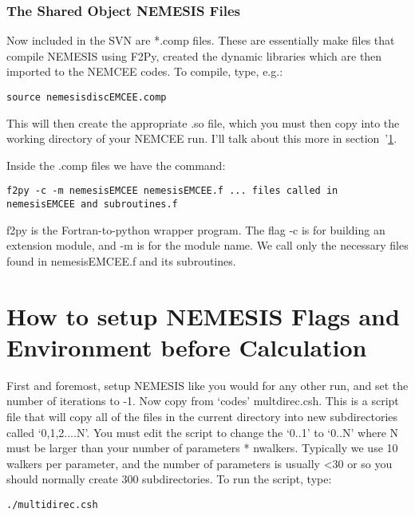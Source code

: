 \documentclass[11pt, a4paper,titlepage]{report}
\begin{document}
\subsubsection{The Shared Object NEMESIS Files}

Now included in the SVN are *.comp files. These are essentially make files that compile NEMESIS using F2Py, created the dynamic libraries which are then imported to the NEMCEE codes. To compile, type, e.g.:

\lstset{language=csh} 
\begin{lstlisting}
source nemesisdiscEMCEE.comp

\end{lstlisting}

This will then create the appropriate .so file, which you must then copy into the working directory of your NEMCEE run. I'll talk about this more in section~'\ref{sec:setup}. 

Inside the .comp files we have the command:

\lstset{language=csh} 
\begin{lstlisting}
f2py -c -m nemesisEMCEE nemesisEMCEE.f ... files called in 
nemesisEMCEE and subroutines.f
\end{lstlisting}

f2py is the Fortran-to-python wrapper program. The flag -c is for building an extension module, and -m is for the module name. We call only the necessary files found in nemesisEMCEE.f and its subroutines.

\section{How to setup NEMESIS Flags and Environment before Calculation}\label{sec:setup}

First and foremost, setup NEMESIS like you would for any other run, and set the number of iterations to -1. Now copy from `codes' multdirec.csh. This is a script file that will copy all of the files in the current directory into new subdirectories called `0,1,2....N'. You must edit the script to change the `0..1' to `0..N' where N must be larger than your number of parameters * nwalkers. Typically we use 10 walkers per parameter, and the number of parameters is usually <30 or so you should normally create 300 subdirectories. To run the script, type:

\lstset{language=csh} 
\begin{lstlisting}
./multidirec.csh
\end{lstlisting}
\end{document}
